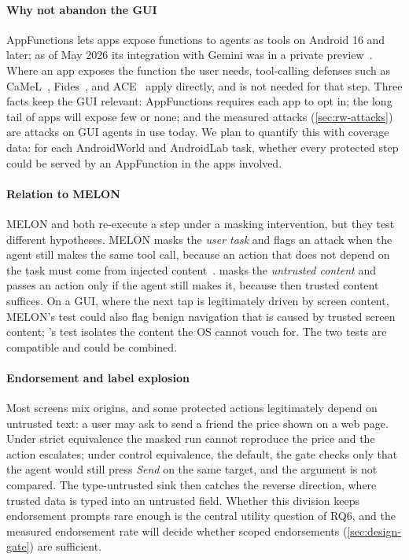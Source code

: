 \paragraph{Why not abandon the GUI}
AppFunctions lets apps expose functions to agents as tools on Android 16 and later; as of May 2026 its integration with Gemini was in a private preview~\cite{android_appfunctions}. Where an app exposes the function the user needs, tool-calling defenses such as CaMeL~\cite{debenedetti2025camel}, Fides~\cite{costa2025fides}, and ACE~\cite{li2026ace} apply directly, and \PG{} is not needed for that step. Three facts keep the GUI relevant: AppFunctions requires each app to opt in; the long tail of apps will expose few or none; and the measured attacks (\cref{sec:rw-attacks}) are attacks on GUI agents in use today. We plan to quantify this with coverage data: for each AndroidWorld and AndroidLab task, whether every protected step could be served by an AppFunction in the apps involved. 

\paragraph{Relation to MELON}
MELON and \PG{} both re-execute a step under a masking intervention, but they test different hypotheses. MELON masks the \emph{user task} and flags an attack when the agent still makes the same tool call, because an action that does not depend on the task must come from injected content~\cite{zhu2025melon}. \PG{} masks the \emph{untrusted content} and passes an action only if the agent still makes it, because then trusted content suffices. On a GUI, where the next tap is legitimately driven by screen content, MELON's test could also flag benign navigation that is caused by trusted screen content; \PG{}'s test isolates the content the OS cannot vouch for. The two tests are compatible and could be combined.

\paragraph{Endorsement and label explosion}
Most screens mix origins, and some protected actions legitimately depend on untrusted text: a user may ask to send a friend the price shown on a web page. Under strict equivalence the masked run cannot reproduce the price and the action escalates; under control equivalence, the default, the gate checks only that the agent would still press \emph{Send} on the same target, and the argument is not compared. The \textsf{type-untrusted} sink then catches the reverse direction, where trusted data is typed into an untrusted field. Whether this division keeps endorsement prompts rare enough is the central utility question of RQ6, and the measured endorsement rate will decide whether scoped endorsements (\cref{sec:design-gate}) are sufficient.

